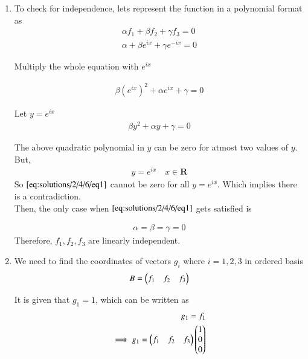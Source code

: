 	\begin{enumerate}[label=(\alph*)]
		\item To check for independence, lets represent the function in a polynomial format as \\
		
		\begin{align}
			\alpha f_1 + \beta f_2 + \gamma f_3 = 0\\
			\alpha + \beta e^{ix} + \gamma e^{-ix} = 0 
		\end{align}
		
		Multiply the whole equation with $e^{ix}$ 
		
		\begin{align}
			\beta (e^{ix})^{2} + \alpha e^{ix} + \gamma = 0
		\end{align}
		
		Let $y = e^{ix}$
		\begin{align}
			\beta y^{2} + \alpha y + \gamma = 0 \label{eq:solutions/2/4/6/eq1}
		\end{align}
		
		The above quadratic polynomial in $y$ can be zero for atmost two values of $y$. But, 
		\begin{align}
			y = e^{ix} \quad x \in \mathbf{R}
		\end{align}
		So $\eqref{eq:solutions/2/4/6/eq1}$ cannot be zero for all $y = e^{ix}$. Which implies there is a contradiction. \\
		
		Then, the only case when $\eqref{eq:solutions/2/4/6/eq1}$ gets satisfied is
		
		\begin{align}
			\alpha = \beta = \gamma = 0
		\end{align}
		Therefore, $f_1, f_2, f_3$ are linearly independent. \\
		
		\item We need to find the coordinates of vectors $g_i$ where $i = 1, 2, 3$ in ordered basis
		\begin{align}
			B = \begin{pmatrix}f_1 & f_2 & f_3\end{pmatrix} \label{eq:solutions/2/4/6/eq5}
		\end{align}
		
		It is given that $g_1 = 1$, which can be written as 
		\begin{align}
			g_1 = f_1 \label{eq:solutions/2/4/6/eq4}   \\ 
			\implies g_1 = \begin{pmatrix}f_1 & f_2 & f_3\end{pmatrix}\begin{pmatrix}1\\0\\0\end{pmatrix}
		\end{align}
		

\end{enumerate}
